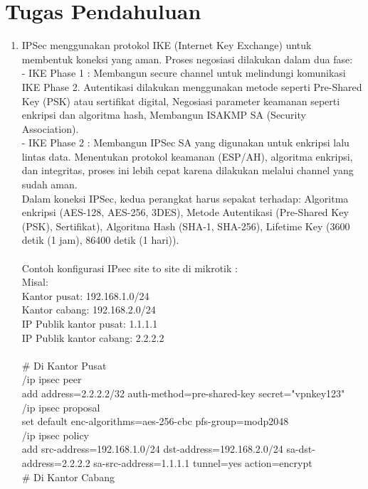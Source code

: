 \section{Tugas Pendahuluan}
\begin{enumerate}
	\item IPSec menggunakan protokol IKE (Internet Key Exchange) untuk membentuk koneksi yang aman. Proses negosiasi dilakukan dalam dua fase: \\ 
	- IKE Phase 1 : Membangun secure channel untuk melindungi komunikasi IKE Phase 2. Autentikasi dilakukan menggunakan metode seperti Pre-Shared Key (PSK) atau sertifikat digital, Negosiasi parameter keamanan seperti enkripsi dan algoritma hash, Membangun ISAKMP SA (Security Association). \\
	- IKE Phase 2 : Membangun IPSec SA yang digunakan untuk enkripsi lalu lintas data. Menentukan protokol keamanan (ESP/AH), algoritma enkripsi, dan integritas, proses ini lebih cepat karena dilakukan melalui channel yang sudah aman. \\
	Dalam koneksi IPSec, kedua perangkat harus sepakat terhadap: Algoritma enkripsi (AES-128, AES-256, 3DES), Metode Autentikasi (Pre-Shared Key (PSK), Sertifikat), Algoritma Hash (SHA-1, SHA-256), Lifetime Key (3600 detik (1 jam), 86400 detik (1 hari)). \\ \\ 
	Contoh konfigurasi IPsec site to site di mikrotik : \\
	Misal: \\
	Kantor pusat: 192.168.1.0/24 \\
	Kantor cabang: 192.168.2.0/24 \\
	IP Publik kantor pusat: 1.1.1.1 \\ 
	IP Publik kantor cabang: 2.2.2.2 \\ \\
	\# Di Kantor Pusat \\
	/ip ipsec peer \\
	add address=2.2.2.2/32 auth-method=pre-shared-key secret="vpnkey123" \\
	/ip ipsec proposal \\
	set default enc-algorithms=aes-256-cbc pfs-group=modp2048 \\
	/ip ipsec policy \\ 
	add src-address=192.168.1.0/24 dst-address=192.168.2.0/24 sa-dst-address=2.2.2.2 sa-src-address=1.1.1.1 tunnel=yes action=encrypt \\
	\# Di Kantor Cabang \\

\end{enumerate}
